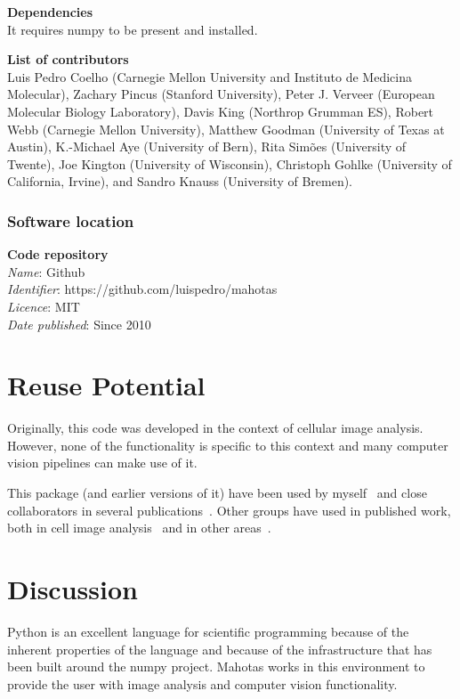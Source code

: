 \documentclass{article}
\begin{document}
\textbf{Dependencies}\\
It requires numpy to be present and installed.


\textbf{List of contributors}\\
Luis Pedro Coelho (Carnegie Mellon University and Instituto de Medicina
Molecular), Zachary Pincus (Stanford University), Peter J. Verveer (European
Molecular Biology Laboratory), Davis King (Northrop Grumman ES), Robert Webb
(Carnegie Mellon University), Matthew Goodman (University of Texas at Austin),
K.-Michael Aye (University of Bern), Rita Sim\~{o}es (University of Twente),
Joe Kington (University of Wisconsin), Christoph Gohlke (University of
California, Irvine), and Sandro Knauss (University of Bremen).

\subsubsection{Software location}

\textbf{Code repository}\\
\textit{Name}: Github\\
\textit{Identifier}: https://github.com/luispedro/mahotas\\
\textit{Licence}: MIT\\
\textit{Date published}: Since 2010

\section{Reuse Potential}

Originally, this code was developed in the context of cellular image analysis.
However, none of the functionality is specific to this context and many
computer vision pipelines can make use of it.

This package (and earlier versions of it) have been used by
myself~\citep{Coelho2009,Coelho2010a} and close collaborators in several
publications~\citep{omerosearcher}. Other groups have used in published work,
both in cell image analysis~\citep{CYTO:CYTO22034} and in other
areas~\citep{springerlink:10.1007/978-3-642-32335-5_2}.


\section{Discussion}

Python is an excellent language for scientific programming because of the
inherent properties of the language and because of the infrastructure that has
been built around the numpy project. Mahotas works in this environment to
provide the user with image analysis and computer vision functionality.
\end{document}

